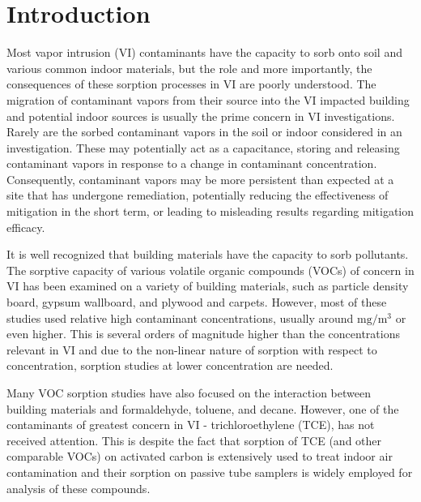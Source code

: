\section{Introduction}\label{sec:intro}

Most vapor intrusion (VI) contaminants have the capacity to sorb onto soil and various common indoor materials, but the role and more importantly, the consequences of these sorption processes in VI are poorly understood\cite{meininghaus_diffusion_2000,meininghaus_diffusion_2002,tillman_review_2005}.
The migration of contaminant vapors from their source into the VI impacted building and potential indoor sources is usually the prime concern in VI investigations.
Rarely are the sorbed contaminant vapors in the soil or indoor considered in an investigation.
These may potentially act as a capacitance, storing and releasing contaminant vapors in response to a change in contaminant concentration.
Consequently, contaminant vapors may be more persistent than expected at a site that has undergone remediation, potentially reducing the effectiveness of mitigation in the short term, or leading to misleading results regarding mitigation efficacy.\par

It is well recognized that building materials have the capacity to sorb pollutants.
The sorptive capacity of various volatile organic compounds (VOCs) of concern in VI has been examined on a variety of building materials, such as particle density board\cite{wang_correlation_2008}, gypsum wallboard\cite{xu_determination_2012}, and plywood and carpets\cite{bodalal_method_2000}.
However, most of these studies used relative high contaminant concentrations, usually around $\mathrm{mg/m^3}$\cite{wang_correlation_2008} or even higher.
This is several orders of magnitude higher than the concentrations relevant in VI and due to the non-linear nature of sorption with respect to concentration, sorption studies at lower concentration are needed.\par

Many VOC sorption studies have also focused on the interaction between building materials and formaldehyde\cite{xu_determination_2012}, toluene, and decane\cite{bodalal_method_2000}.
However, one of the contaminants of greatest concern in VI - trichloroethylene (TCE), has not received attention.
This is despite the fact that sorption of TCE (and other comparable VOCs) on activated carbon is extensively used to treat indoor air contamination and their sorption on passive tube samplers is widely employed for analysis of these compounds\cite{u.s._environmental_protection_agency_oswer_2015}.\par

